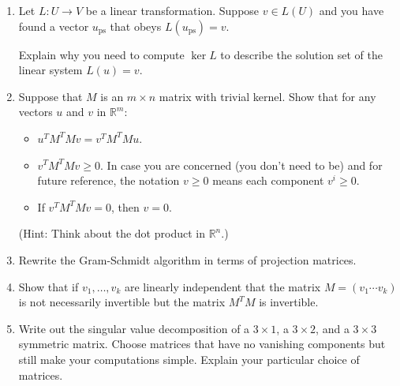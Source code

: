 
\begin{enumerate}
\item \label{kernalsolspaceprob} Let $L:U\rightarrow V$ be a linear transformation.  Suppose $v\in L(U)$ and you have found a vector $u_{\mathrm{ps}}$ that obeys $L(u_{\mathrm{ps}})=v$.

Explain why you need to compute $\ker L$ to describe the solution 
set %
of the linear system $L(u)=v$.


\item \label{problem:ls_prob2} Suppose that $M$ is an $m\times n$ matrix with trivial kernel.  Show that for any vectors $u$ and $v$ in $\mathbb{R}^m$:
\begin{itemize}
\item $u^TM^TMv = v^TM^TMu$.
\item $v^TM^TMv \geq 0$. In case you are concerned (you don't need to be) and for future reference, the notation $v \geq 0$ means each component $v^i \geq 0$.
\item If $v^TM^TMv=0$, then $v=0$.
\end{itemize}
(Hint: Think about the dot product in $\mathbb{R}^n$.)




\item Rewrite the Gram-Schmidt algorithm in terms of projection matrices. 

\item Show that if $v_1,\dots, v_k$ are linearly independent that  the matrix 
$M=(v_1 \cdots v_k)$ is not necessarily invertible but  the matrix $M^TM$ is invertible. 

\item Write out the singular value decomposition of a $3\times 1$, a $3\times 2$, and a $3\times 3$ symmetric matrix. 
Choose matrices that have no vanishing components but still make your computations simple. Explain your particular choice of matrices.


\end{enumerate}
